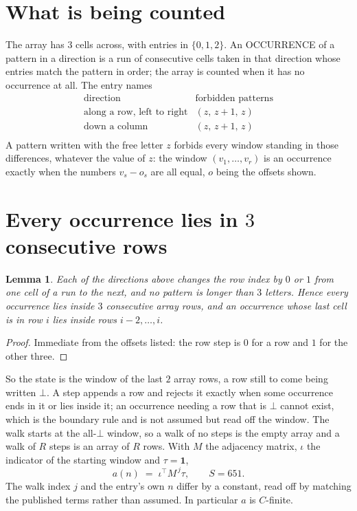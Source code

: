 \documentclass[11pt,a4paper]{article}
\theoremstyle{plain}
\newtheorem{lemma}[theorem]{Lemma}
\theoremstyle{definition}
\begin{document}
\section{What is being counted}

The array has $3$ cells across, with entries in $\{0,1,2\}$. An OCCURRENCE of a pattern in a
direction is a run of consecutive cells taken in that direction whose entries match the pattern
in order; the array is counted when it has no occurrence at all. The entry names
\[
\begin{array}{ll}
\text{direction} & \text{forbidden patterns} \\[2pt]
\text{along a row, left to right} & (z,\,z+1,\,z) \\
\text{down a column} & (z,\,z+1,\,z) \\
\end{array}
\]
 A pattern written with the free letter $z$ forbids every window standing in those differences, whatever the value of $z$: the window $(v_1,\dots,v_r)$ is an occurrence exactly when the numbers $v_s-o_s$ are all equal, $o$ being the offsets shown.

\section{Every occurrence lies in $3$ consecutive rows}

\begin{lemma}\label{lem:win}
Each of the directions above changes the row index by $0$ or $1$ from one cell of a run to the
next, and no pattern is longer than $3$ letters. Hence every occurrence lies inside $3$
consecutive array rows, and an occurrence whose last cell is in row $i$ lies inside rows
$i-2,\dots,i$.
\end{lemma}

\begin{proof}
Immediate from the offsets listed: the row step is $0$ for a row and $1$ for the other three.
\end{proof}

So the state is the window of the last $2$ array rows, a row still to come being written
$\bot$. A step appends a row and rejects it exactly when some occurrence ends in it or lies
inside it; an occurrence needing a row that is $\bot$ cannot exist, which is the boundary rule
and is not assumed but read off the window. The walk starts at the all-$\bot$ window, so a walk
of no steps is the empty array and a walk of $R$ steps is an array of $R$ rows. With $M$ the
adjacency matrix, $\iota$ the indicator of the starting window and $\tau=\mathbf{1}$,
\[
a(n)\;=\;\iota^{\!\top}M^{\,j}\tau ,\qquad S=651.
\]
The walk index $j$ and the entry's own $n$ differ by a constant, read off by matching the
published terms rather than assumed. In particular $a$ is $C$-finite.
\end{document}
